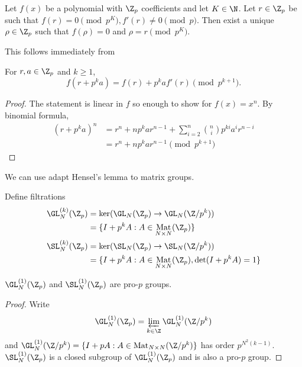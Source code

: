 \documentclass[a4paper]{article}
\DeclareMathOperator{\Mat}{Mat} %
\begin{document}
\begin{proposition}
  Let \(f(x)\) be a polynomial with \(\Z_p\) coefficients and let \(K \in \N\). Let \(r \in \Z_p\) be such that \(f(r) = 0 \pmod{p^K}, f'(r) \ne 0 \pmod p\). Then exist a unique \(\rho \in \Z_p\) such that \(f(\rho) = 0\) and \(\rho = r \pmod{p^K}\).
\end{proposition}

This follows immediately from

\begin{lemma}
  For \(r, a \in \Z_p\) and \(k \geq 1\),
  \[
    f(r + p^ka) = f(r) + p^k af'(r) \pmod{p^{k + 1}}.
  \]
\end{lemma}

\begin{proof}
  The statement is linear in \(f\) so enough to show for \(f(x) = x^n\). By binomial formula,
  \begin{align*}
    (r + p^ka)^n
    &= r^n + np^ka r^{n - 1} + \sum_{i = 2}^n \binom{n}{i} p^{ki}a^i r^{n - i} \\
    &= r^n + np^kar^{n - 1} \pmod{p^{k + 1}}
  \end{align*}
\end{proof}

We can use adapt Hensel's lemma to matrix groups.

\begin{definition}
  Define filtrations
  \begin{align*}
    \GL_N^{(k)}(\Z_p)
    &= \ker(\GL_N(\Z_p) \to \GL_N(\Z/p^k)) \\
    &= \{I + p^k A: A \in \Mat_{N \times N}(\Z_p)\} \\
    \SL_N^{(k)}(\Z_p)
    &= \ker(\SL_N(\Z_p) \to \SL_N(\Z/p^k)) \\
    &= \{I + p^k A: A \in \Mat_{N \times N}(\Z_p), \det(I + p^kA) = 1\}
  \end{align*}
\end{definition}

\begin{proposition}
  \(\GL_N^{(1)}(\Z_p)\) and \(\SL_N^{(1)}(\Z_p)\) are pro-\(p\) groups.
\end{proposition}

\begin{proof}
  Write
  \[
    \GL_N^{(1)}(\Z_p) = \varprojlim_{k \in \Z} \GL_N^{(1)}(\Z/p^k)
  \]
  and \(\GL_N^{(1)}(\Z/p^k) = \{I + pA: A \in \Mat_{N \times N}(\Z/p^k)\}\) has order \(p^{N^2(k - 1)}\). \(\SL_N^{(1)}(\Z_p)\) is a closed subgroup of \(\GL_N^{(1)}(\Z_p)\) and is also a pro-\(p\) group.
\end{proof}
\end{document}

